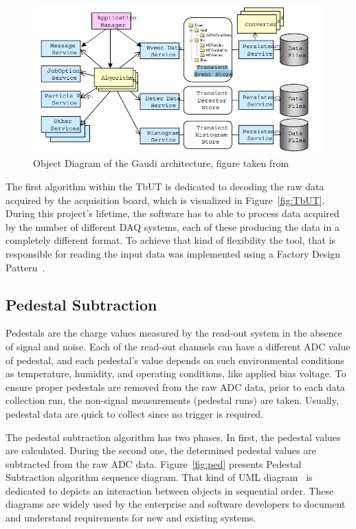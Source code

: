 \begin{figure}[h]
\centering
\includegraphics{figures/Gaudi.png}
\caption{Object Diagram of the Gaudi architecture, figure taken from~\cite{gaudi} }
\label{fig:gaudi flow}
\end{figure}

The first algorithm within the TbUT is dedicated to decoding the raw data acquired by the acquisition board, which is visualized in Figure~\ref{fig:TbUT}.  
During this project's lifetime, the software has to able to process data acquired by the number of different DAQ systems, each of these producing the data in a completely different format.  To achieve that kind of flexibility the tool, that is responsible for reading the input data was implemented using a Factory Design Pattern~\cite{DesignPatterns}. 

\subsection{Pedestal Subtraction}

Pedestals are the charge values measured by the read-out system in the absence of signal and noise. Each of the read-out channels can have a different ADC value of pedestal, and each pedestal's value depends on such environmental conditions as temperature, humidity, and operating conditions, like applied bias voltage. 
To ensure proper pedestals are removed from the raw ADC data, prior to each data collection run, the non-signal measurements (pedestal runs) are taken. Usually, pedestal data are quick to collect since no trigger is required. 

The pedestal subtraction algorithm has two phases. In first, the pedestal values are calculated. During the second one, the determined pedestal values are subtracted from the raw ADC data. Figure~\ref{fig:ped} presents Pedestal Subtraction algorithm sequence diagram. That kind of UML diagram~\cite{UML} is dedicated to depicts an interaction between objects in sequential order. These diagrams are widely used by the enterprise and software developers to document and understand requirements for new and existing systems. 

